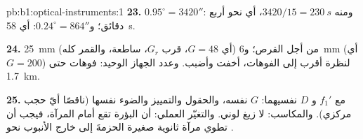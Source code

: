 \begin{solution}{pb:b1:optical-instruments:1}
\textbf{23.} $0.95^\circ = 3420''$: ومنه $3420/15 = \qty{230}{s}$، أي نحو أربع
دقائق؛ و$0.24^\circ = 864''$: أي \qty{58}{s}.

\textbf{24.}  \qty{25}{mm} (أي $G = 48$، قرب $G_r$، ساطعة، والقمر
كله) من أجل القرص؛ و\qty{6}{mm} (أي $G = 200$) لنظرة أقرب إلى الفوهات،
أخفت وأضبب. وعدد الجهاز الوحيد: فوهات حتى
\qty{1.7}{km}.

\textbf{25.} مع $f_1'$ و $D$ نفسيهما: $G$ نفسه، والحقول 
والتمييز والضوء نفسها (ناقصًا أيّ حجب مركزي). والمكاسب: لا
زيغ لوني. والتغيّر العملي: أن البؤرة تقع أمام
المرآة، فيجب أن تطوي مرآة ثانوية صغيرة الحزمةَ إلى خارج الأنبوب نحو
.
\end{solution}
